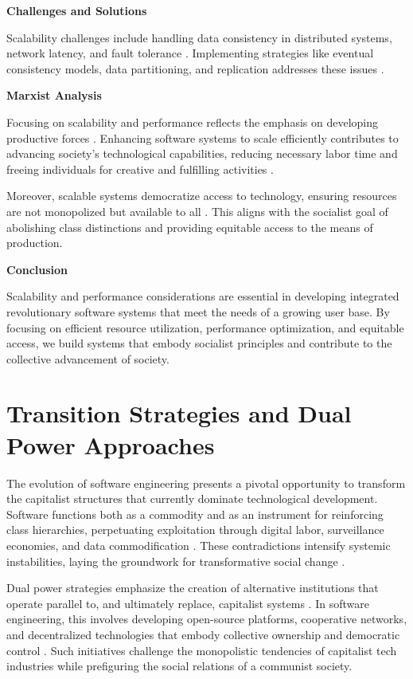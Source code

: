 \begin{refsection}
\textbf{Challenges and Solutions}

Scalability challenges include handling data consistency in distributed systems, network latency, and fault tolerance \cite[pp.~180-182]{Vogels2009}. Implementing strategies like eventual consistency models, data partitioning, and replication addresses these issues \cite[pp.~190-192]{Brewer2012}.

\textbf{Marxist Analysis}

Focusing on scalability and performance reflects the emphasis on developing productive forces \cite[pp.~488-490]{Marx1867}. Enhancing software systems to scale efficiently contributes to advancing society's technological capabilities, reducing necessary labor time and freeing individuals for creative and fulfilling activities \cite[pp.~708-710]{Marx1867}.

Moreover, scalable systems democratize access to technology, ensuring resources are not monopolized but available to all \cite[pp.~34-35]{Marx1848}. This aligns with the socialist goal of abolishing class distinctions and providing equitable access to the means of production.

\textbf{Conclusion}

Scalability and performance considerations are essential in developing integrated revolutionary software systems that meet the needs of a growing user base. By focusing on efficient resource utilization, performance optimization, and equitable access, we build systems that embody socialist principles and contribute to the collective advancement of society.

\section{Transition Strategies and Dual Power Approaches}

The evolution of software engineering presents a pivotal opportunity to transform the capitalist structures that currently dominate technological development. Software functions both as a commodity and as an instrument for reinforcing class hierarchies, perpetuating exploitation through digital labor, surveillance economies, and data commodification \cite[pp.~644-645]{marx_capital_vol1}. These contradictions intensify systemic instabilities, laying the groundwork for transformative social change \cite[pp.~28-30]{lenin_state_revolution}.

Dual power strategies emphasize the creation of alternative institutions that operate parallel to, and ultimately replace, capitalist systems \cite[pp.~52-55]{gramsci_prison_notebooks}. In software engineering, this involves developing open-source platforms, cooperative networks, and decentralized technologies that embody collective ownership and democratic control \cite[pp.~115-117]{harvey_seventeen_contradictions}. Such initiatives challenge the monopolistic tendencies of capitalist tech industries while prefiguring the social relations of a communist society.


\end{refsection}
